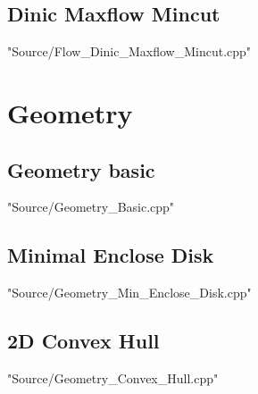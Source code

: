 \documentclass [12pt,twocolumn,oneside]{article}
\begin{document}
\subsection{Dinic Maxflow Mincut}
 {"Source/Flow_Dinic_Maxflow_Mincut.cpp"}




\newpage
\section{Geometry}
\subsection{Geometry basic}
 {"Source/Geometry_Basic.cpp"}

\subsection{Minimal Enclose Disk}
 {"Source/Geometry_Min_Enclose_Disk.cpp"}

\subsection{2D Convex Hull}
 {"Source/Geometry_Convex_Hull.cpp"}
\end{document}
